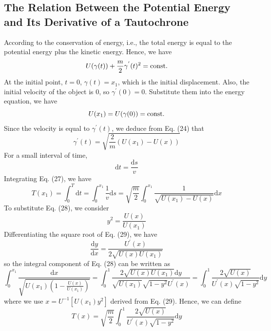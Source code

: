 \documentclass[12pt]{report}
\begin{document}
\subsection{The Relation Between the Potential Energy and Its Derivative of a Tautochrone}
According to the conservation of energy, i.e., the total energy is equal to the potential energy plus the kinetic energy. Hence, we have
\begin{equation}
    U(\gamma(t))+\dfrac{m}{2}\gamma^{'}(t)^2=\rm{const}.
\end{equation}
At the initial point, $t=0$, $\gamma(t)=x_1$, which is the initial displacement. Also, the initial velocity of the object is 0, so $\gamma^{'}(0)=0$. Substitute them into the energy equation, we have
\begin{equation}
    U(x_1)=U(\gamma(0))=\rm{const}.
\end{equation}
Since the velocity is equal to $\gamma^{'}(t)$, we deduce from Eq. (24) that
\begin{equation}
    \gamma^{'}(t)=\sqrt{\dfrac{2}{m}(U(x_1)-U(x))}
\end{equation}
For a small interval of time,
\begin{equation}
    \mathrm{d}t=\dfrac{\mathrm{d}s}{v}
\end{equation}
Integrating Eq. (27), we have
\begin{equation}
    T(x_1)=\int_0^T\mathrm{d}t=\int_0^{x_1}\dfrac{1}{v}\mathrm{d}s=\sqrt{\dfrac{m}{2}}\int_0^{x_1}\dfrac{1}{\sqrt{U(x_1)-U(x)}}\mathrm{d}x
\end{equation}
To substitute Eq. (28), we consider
\begin{equation}
    y^2=\dfrac{U(x)}{U(x_1)}
\end{equation}
Differentiating the square root of Eq. (29), we have
\begin{equation}
    \dfrac{\mathrm{d}y}{\mathrm{d}x}=\dfrac{U^{'}(x)}{2\sqrt{U(x)U(x_1)}}
\end{equation}
so the integral component of Eq. (28) can be written as
\begin{equation}
    \int_0^{x_1}\dfrac{\mathrm{d}x}{\sqrt{U(x_1)(1-\frac{U(x)}{U(x_1)})}}=\int_{0}^{1}\dfrac{2\sqrt{U(x)U(x_1)}\mathrm{d}y}{\sqrt{U(x_1)}\sqrt{1-y^2}U^{'}(x)}=\int_0^1\dfrac{2\sqrt{U(x)}}{U^{'}(x)\sqrt{1-y^2}}\mathrm{d}y
\end{equation}
where we use $x=U^{-1}[U(x_1)y^2]$ derived from Eq. (29). Hence, we can define
\begin{equation}
    T(x)=\sqrt{\dfrac{m}{2}}\int_0^1\dfrac{2\sqrt{U(x)}}{U^{'}(x)\sqrt{1-y^2}}\mathrm{d}y
\end{equation}
\end{document}
